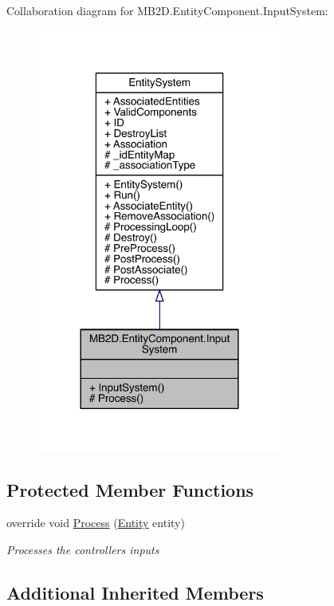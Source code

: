 Collaboration diagram for M\+B2\+D.\+Entity\+Component.\+Input\+System\+:
\nopagebreak
\begin{figure}[H]
\begin{center}
\leavevmode
\includegraphics[width=228pt]{class_m_b2_d_1_1_entity_component_1_1_input_system__coll__graph}
\end{center}
\end{figure}
\subsection*{Protected Member Functions}
\begin{DoxyCompactItemize}
\item 
override void \hyperlink{class_m_b2_d_1_1_entity_component_1_1_input_system_afa241f5c32788fc65587e0443f7217b3}{Process} (\hyperlink{class_m_b2_d_1_1_entity_component_1_1_entity}{Entity} entity)
\begin{DoxyCompactList}\small\item\em Processes the controllers inputs \end{DoxyCompactList}\end{DoxyCompactItemize}
\subsection*{Additional Inherited Members}


